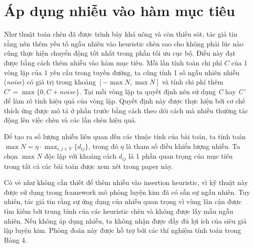\section{Áp dụng nhiễu vào hàm mục tiêu}
Như thuật toán chèn đã được trình bày khá nông và còn thiếu sót, tác giả tin rằng nên thêm yếu tố ngẫu nhiên vào heuristic chèn sao cho không phải lúc nào cũng thực hiện chuyển động tốt nhất trong phần tối ưu cục bộ. Điều này đạt được bằng cách thêm nhiễu vào hàm mục tiêu. Mỗi lần tính toàn chi phí $C$ của 1 vòng lặp của 1 yêu cầu trong tuyến đường, ta cũng tính 1 số ngẫu nhiên nhiễu (\textit{noise}) có giá trị trong khoảng $\left[ -\max N, \max N \right]$ và tính chi phí thêm $C'=\max\{ 0, C+noise \}$. Tại mỗi vòng lặp ta quyết định nên sử dụng \textit{C} hay \textit{C'} để làm rõ tính hiệu quả của vòng lặp. Quyết định này được thực hiện bởi cơ chế thích ứng được mô tả ở phần trước bằng cách theo dõi cách mà nhiều thường tác động lên việc chèn và các lần chèn hiệu quả.

Để tạo ra số lượng nhiễu liên quan đến các thuộc tính của bài toán, ta tính toán $\max N = \eta\cdot \max_{i,j \in V} \{d_{ij}\}$, trong đó $\eta$ là tham số điều khiển lượng nhiễu. Ta chọn $\max N$ độc lập với khoảng cách $d_{ij}$ là 1 phần quan trọng của mục tiêu trong tất cả các bài toán được xem xét trong paper này.

Có vẻ như không cần thiết để thêm nhiễu vào insertion heuristic, vì kỹ thuật này được sử dụng trong framework mô phỏng luyện kim đã có sẵn sự ngẫu nhiên. Tuy nhiên, tác giả tin rằng sự ứng dụng của nhiễu quan trọng vì vùng lân cận được tìm kiếm bởi trung bình của các heuristic chèn và không được lấy mẫu ngẫu nhiên. Nếu không áp dụng nhiễu, ta không nhận được đầy đủ lợi ích của siêu giả lập luyện kim. Phỏng đoán này được hỗ trợ bởi các thí nghiệm tính toán trong Bảng 4.

